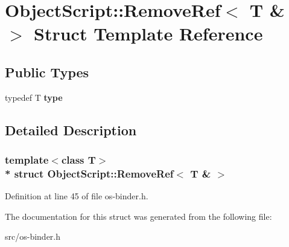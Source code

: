 \hypertarget{struct_object_script_1_1_remove_ref_3_01_t_01_6_01_4}{}\section{Object\+Script\+:\+:Remove\+Ref$<$ T \& $>$ Struct Template Reference}
\label{struct_object_script_1_1_remove_ref_3_01_t_01_6_01_4}
\subsection*{Public Types}
\begin{DoxyCompactItemize}
\item 
typedef T {\bfseries type}\hypertarget{struct_object_script_1_1_remove_ref_3_01_t_01_6_01_4_a9d104645fc6be428462f0af8ecc1f533}{}\label{struct_object_script_1_1_remove_ref_3_01_t_01_6_01_4_a9d104645fc6be428462f0af8ecc1f533}

\end{DoxyCompactItemize}


\subsection{Detailed Description}
\subsubsection*{template$<$class T$>$\\*
struct Object\+Script\+::\+Remove\+Ref$<$ T \& $>$}



Definition at line 45 of file os-\/binder.\+h.



The documentation for this struct was generated from the following file\+:\begin{DoxyCompactItemize}
\item 
src/os-\/binder.\+h\end{DoxyCompactItemize}
